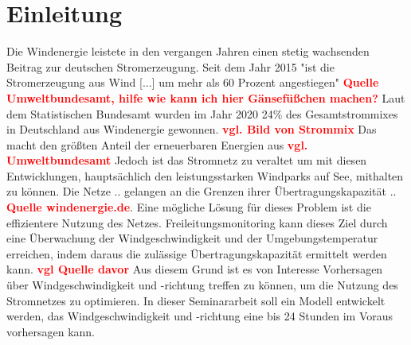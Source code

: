 \documentclass[
12pt, %
toc=listofnumbered, %
toc=chapterentrydotfill, %
numbers=noenddot, %
captions=tableheading, %
]{scrreprt}
\newcommand{\highlight}[1]{\textbf{\textcolor{red}{#1}}}
\begin{document}
\tableofcontents
\chapter{Einleitung}

Die Windenergie leistete in den vergangen Jahren einen stetig wachsenden Beitrag zur deutschen Stromerzeugung. 
Seit dem Jahr 2015 "ist die Stromerzeugung aus Wind [...] um mehr als 60 Prozent angestiegen" \highlight{Quelle Umweltbundesamt, hilfe wie kann ich hier Gänsefüßchen machen?}
Laut dem Statistischen Bundesamt wurden im Jahr 2020 24\% des Gesamtstrommixes in Deutschland aus Windenergie gewonnen. \highlight{vgl. Bild von Strommix} 
Das macht den größten Anteil der erneuerbaren Energien aus \highlight{vgl. Umweltbundesamt}
Jedoch ist das Stromnetz zu veraltet um mit diesen Entwicklungen, hauptsächlich den leistungsstarken Windparks auf See, 
mithalten zu können. Die Netze .. gelangen an die Grenzen ihrer Übertragungskapazität .. \highlight{Quelle windenergie.de}.
Eine mögliche Lösung für dieses Problem ist die effizientere Nutzung des Netzes. Freileitungsmonitoring kann dieses Ziel 
durch eine Überwachung der Windgeschwindigkeit und der Umgebungstemperatur erreichen, indem daraus die zulässige Übertragungskapazität ermittelt werden kann. \highlight{vgl Quelle davor}
Aus diesem Grund ist es von Interesse Vorhersagen über Windgeschwindigkeit und -richtung treffen zu können, um 
die Nutzung des Stromnetzes zu optimieren. In dieser Seminararbeit soll ein Modell entwickelt werden, das 
Windgeschwindigkeit und -richtung eine bis 24 Stunden im Voraus vorhersagen kann.
\end{document}
